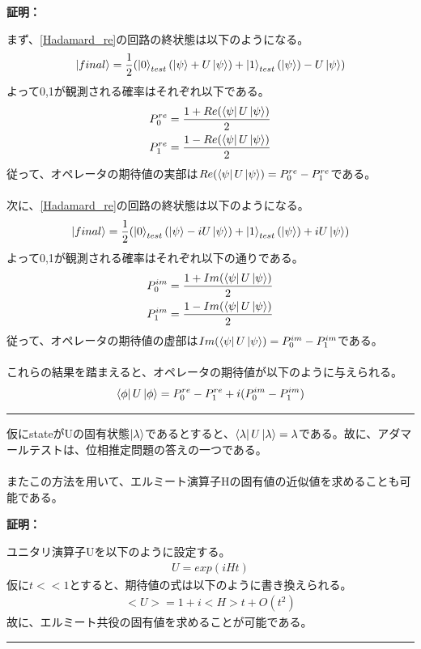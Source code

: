 \documentclass[a4paper,10.5pt]{article}
\numberwithin{equation}{section}
\newenvironment{proofbox}
{\begin{prooflabel}\textbf{証明：}\end{prooflabel}\vspace{0.8em}}
{\par\vspace{1em}\hrule\vspace{1em}}
\begin{document}
\begin{proofbox}
まず、\eqref{Hadamard_re}の回路の終状態は以下のようになる。
\begin{equation}\begin{split}
    \ket{final}=\frac{1}{2}(\ket{0}_{test}(\ket{\psi}+U\ket{\psi})
    +\ket{1}_{test}(\ket{\psi})-U\ket{\psi})
\end{split} \end{equation}
よって0,1が観測される確率はそれぞれ以下である。
\begin{align}
P^{re}_{0}&=\frac{1+Re(\bra{\psi}U\ket{\psi})}{2}\\
P^{re}_{1}&=\frac{1-Re(\bra{\psi}U\ket{\psi})}{2}
\end{align}
従って、オペレータの期待値の実部は$Re(\bra{\psi}U\ket{\psi})=P^{re}_{0}-P^{re}_{1}$である。\\
\\
次に、\eqref{Hadamard_re}の回路の終状態は以下のようになる。
\begin{equation}\begin{split}
     \ket{final}=\frac{1}{2}(\ket{0}_{test}(\ket{\psi}-iU\ket{\psi})
    +\ket{1}_{test}(\ket{\psi})+iU\ket{\psi})
\end{split} \end{equation}
よって0,1が観測される確率はそれぞれ以下の通りである。
\begin{align}
P^{im}_{0}&=\frac{1+Im(\bra{\psi}U\ket{\psi})}{2}\\
P^{im}_{1}&=\frac{1-Im(\bra{\psi}U\ket{\psi})}{2}
\end{align}
従って、オペレータの期待値の虚部は$Im(\bra{\psi}U\ket{\psi})=P^{im}_{0}-P^{im}_{1}$である。\\
\\
これらの結果を踏まえると、オペレータの期待値が以下のように与えられる。
\begin{align*}
\bra{\phi}U\ket{\phi}=P^{re}_{0}-P^{re}_{1}+i(P^{im}_{0}-P^{im}_{1})
\end{align*}
\end{proofbox}
仮にstateがUの固有状態$\ket{\lambda}$であるとすると、$\bra{\lambda}U\ket{\lambda}=\lambda$である。故に、アダマールテストは、位相推定問題の答えの一つである。\\
\\
またこの方法を用いて、エルミート演算子Hの固有値の近似値を求めることも可能である。
\begin{proofbox}
ユニタリ演算子Uを以下のように設定する。
\begin{align*}
U=exp(iHt)
\end{align*}
仮に$t <<1$とすると、期待値の式は以下のように書き換えられる。
\begin{align*}
<U>=1+i<H>t +O(t^{2})
\end{align*}
故に、エルミート共役の固有値を求めることが可能である。
\end{proofbox}
\end{document}
